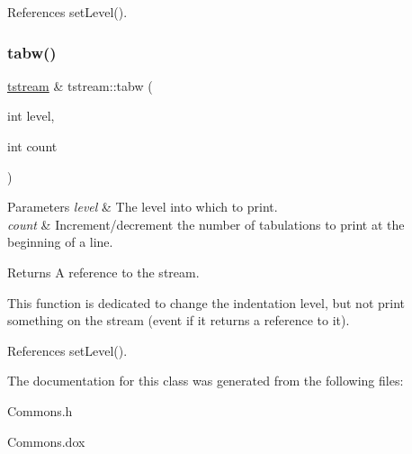 References set\+Level().

\mbox{\label{clasststream_a5aa7a21d7b95f1bf40e68b5b13118fd0}} 
\subsubsection{\texorpdfstring{tabw()}{tabw()}}
{\footnotesize\ttfamily \mbox{\hyperlink{clasststream}{tstream}} \& tstream\+::tabw (\begin{DoxyParamCaption}\item[{int}]{level,  }\item[{int}]{count }\end{DoxyParamCaption})\hspace{0.3cm}{\ttfamily [inline]}}


\begin{DoxyParams}{Parameters}
{\em level} & The level into which to print. \\
\hline
{\em count} & Increment/decrement the number of tabulations to print at the beginning of a line. \\
\hline
\end{DoxyParams}
\begin{DoxyReturn}{Returns}
A reference to the stream.
\end{DoxyReturn}
This function is dedicated to change the indentation level, but not print something on the stream (event if it returns a reference to it). 

References set\+Level().



The documentation for this class was generated from the following files\+:\begin{DoxyCompactItemize}
\item 
Commons.\+h\item 
Commons.\+dox\end{DoxyCompactItemize}
